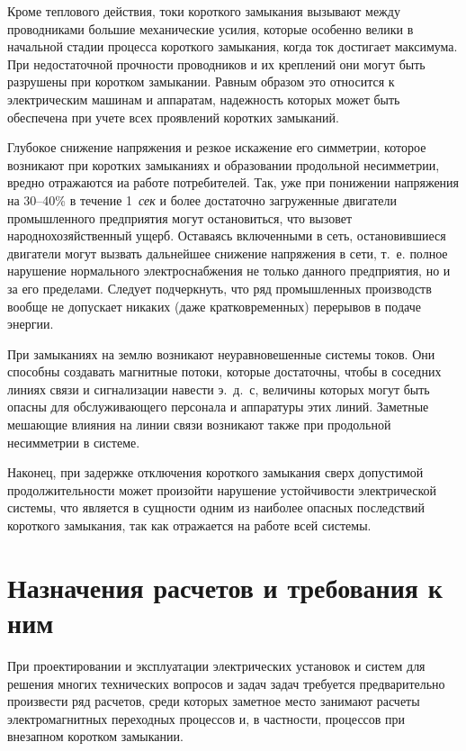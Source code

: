 Кроме теплового действия, токи короткого замыкания вызывают между проводниками большие механические усилия, которые особенно велики в начальной стадии процесса короткого замыкания, когда ток достигает максимума. При недостаточной прочности проводников и их креплений они могут быть разрушены при коротком замыкании. Равным образом это относится к электрическим машинам и аппаратам, надежность которых может быть обеспечена при учете всех проявлений коротких замыканий.

Глубокое снижение напряжения и резкое искажение его симметрии, которое возникают при коротких замыканиях и образовании продольной несимметрии, вредно отражаются иа работе потребителей. Так, уже при понижении напряжения на 30--40\% в течение 1~\textit{сек} и более достаточно загруженные двигатели промышленного предприятия могут остановиться, что вызовет народнохозяйственный ущерб. Оставаясь включенными в сеть, остановившиеся двигатели могут вызвать дальнейшее снижение напряжения в сети, т.~е. полное нарушение нормального электроснабжения не только данного предприятия, но и за его пределами. Следует подчеркнуть, что ряд промышленных производств вообще не допускает никаких (даже кратковременных) перерывов в подаче энергии.

При замыканиях на землю возникают неуравновешенные системы токов. Они способны создавать магнитные потоки, которые достаточны, чтобы в соседних линиях связи и сигнализации навести э.~д.~с, величины которых могут быть опасны для обслуживающего персонала и аппаратуры этих линий. Заметные мешающие влияния на линии связи возникают также при продольной несимметрии в системе.

Наконец, при задержке отключения короткого замыкания сверх допустимой продолжительности может произойти нарушение устойчивости электрической системы, что является в сущности одним из наиболее опасных последствий короткого замыкания, так как отражается на работе всей системы.

\section{Назначения расчетов и требования к ним}
\label{sec:1-3 naznacheniia_raschetov_i_trebovaniia_k_nim}

При проектировании и эксплуатации электрических установок и систем для решения многих технических вопросов и задач задач требуется предварительно произвести ряд расчетов, среди которых заметное место занимают расчеты электромагнитных переходных процессов и, в частности, процессов при внезапном коротком замыкании.

